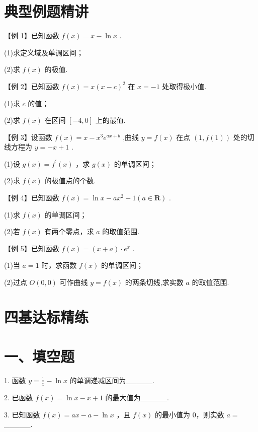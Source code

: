 \section*{典型例题精讲}

【例 1】已知函数 $f\left( x\right)  = x - \ln x$ .

(1)求定义域及单调区间；

(2)求 $f\left( x\right)$ 的极值.

【例 2】已知函数 $f\left( x\right)  = x{\left( x - c\right) }^{2}$ 在 $x =  - 1$ 处取得极小值.

(1)求 $c$ 的值；

(2)求 $f\left( x\right)$ 在区间 $\left\lbrack  {-4,0}\right\rbrack$ 上的最值.

【例 3】设函数 $f\left( x\right)  = x - {x}^{3}{{e}}^{{ax} + b}$ ,曲线 $y = f\left( x\right)$ 在点 $\left( {1,f\left( 1\right) }\right)$ 处的切线方程为 $y =  - x + 1$ .

(1)设 $g\left( x\right)  = {f}^{\prime }\left( x\right)$ ，求 $g\left( x\right)$ 的单调区间；

(2)求 $f\left( x\right)$ 的极值点的个数.

【例 4】已知函数 $f\left( x\right)  = \ln x - a{x}^{2} + 1\left( {a \in  \mathbf{R}}\right)$ .

(1)求 $f\left( x\right)$ 的单调区间；

(2)若 $f\left( x\right)$ 有两个零点，求 $a$ 的取值范围.

【例 5】已知函数 $f\left( x\right)  = \left( {x + a}\right)  \cdot  {{e}}^{x}$ .

(1)当 $a = 1$ 时，求函数 $f\left( x\right)$ 的单调区间；

(2)过点 $O\left( {0,0}\right)$ 可作曲线 $y = f\left( x\right)$ 的两条切线,求实数 $a$ 的取值范围.

\section*{四基达标精练}

\section*{一、填空题}

1. 函数 $y = \frac{1}{x} - \ln x$ 的单调递减区间为\_\_\_\_\_.

2. 已函数 $f\left( x\right)  = \ln x - x + 1$ 的最大值为\_\_\_\_\_.

3. 已知函数 $f\left( x\right)  = {ax} - a - \ln x$ ，且 $f\left( x\right)$ 的最小值为 0，则实数 $a =$ \_\_\_\_\_.

